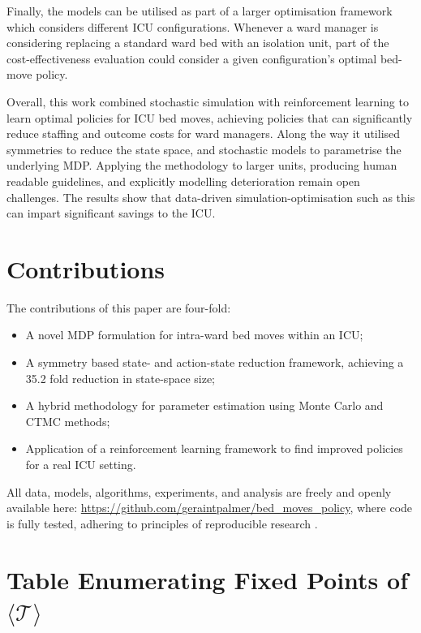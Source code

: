 \documentclass{article}
\begin{document}
Finally, the models can be utilised as part of a larger optimisation framework
which considers different ICU configurations.
Whenever a ward manager is considering replacing a standard ward bed with an
isolation unit, part of the cost-effectiveness evaluation could consider a given
configuration's optimal bed-move policy.

Overall, this work combined stochastic simulation with reinforcement learning to
learn optimal policies for ICU bed moves, achieving policies that can
significantly reduce staffing and outcome costs for ward managers.
Along the way it utilised symmetries to reduce the state space, and stochastic
models to parametrise the underlying MDP.
Applying the methodology to larger units, producing human readable guidelines,
and explicitly modelling deterioration remain open challenges.
The results show that data-driven simulation-optimisation such as this can
impart significant savings to the ICU.

\section{Contributions}
The contributions of this paper are four-fold:

\begin{itemize}
  \item A novel MDP formulation for intra-ward bed moves within an ICU;
  \item A symmetry based state- and action-state reduction framework, achieving
  a 35.2 fold reduction in state-space size;
  \item A hybrid methodology for parameter estimation using Monte Carlo and CTMC
  methods;
  \item Application of a reinforcement learning framework to find improved
  policies for a real ICU setting.
\end{itemize}

All data, models, algorithms, experiments, and analysis are freely and openly
available here: \url{https://github.com/geraintpalmer/bed_moves_policy}, where
code is fully tested, adhering to principles of reproducible research
\cite{benureau18}.




\appendix

\section{Table Enumerating Fixed Points of $\langle\mathcal{T}\rangle$}\label{apx:burnside}
\end{document}
